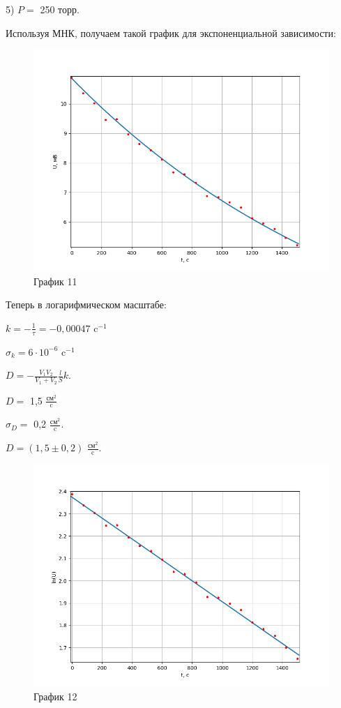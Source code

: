 \documentclass[a4paper,12pt]{article} %
\begin{document}
\begin{enumerate}
\newpage


5) $P = $ 250 торр.

Используя МНК, получаем такой график для экспоненциальной зависимости:
\begin{figure}[h!]
	\centering
	\includegraphics[scale=0.8]{Pictures/График5(эксп).png}
	\caption*{График 11}
\end{figure}

Теперь в логарифмическом масштабе:

$k = -\frac{1}{\tau} = -0,00047$ c$^{-1}$

$\sigma_{k} = 6\cdot 10^{-6}$ c$^{-1}$

$D = - \frac{V_{1}V_{2}}{V_{1} + V_{2}}\frac{l}{S}k$.

$D = $ 1,5 $\frac{\text{см}^2}{\text{c}}$

$\sigma_{D} = $ 0,2 $\frac{\text{см}^2}{\text{c}}$.
\vspace{15mm}

$D = (1,5 \pm 0,2)$ $\frac{\text{см}^2}{\text{c}}$.
\newpage
\begin{figure}[h!]
	\centering
	\includegraphics[scale=0.8]{Pictures/График5(лин).png}
	\caption*{График 12}
\end{figure}


\end{enumerate}
\end{document}
